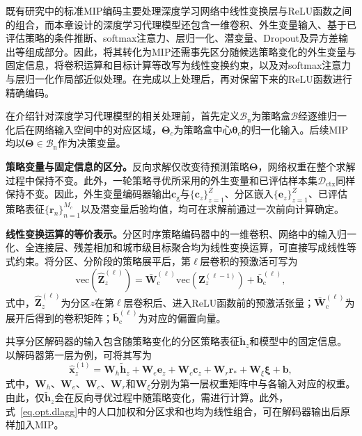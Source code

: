 既有研究中的标准MIP编码主要处理深度学习网络中线性变换层与ReLU函数之间的组合，而本章设计的深度学习代理模型还包含一维卷积、外生变量输入、基于已评估策略的条件推断、softmax注意力、层归一化、潜变量、Dropout及异方差输出等组成部分。因此，将其转化为MIP还需事先区分随候选策略变化的外生变量与固定信息，将卷积运算和目标计算等改写为线性变换约束，以及对softmax注意力与层归一化作局部近似处理。在完成以上处理后，再对保留下来的ReLU函数进行精确编码。

在介绍针对深度学习代理模型的相关处理前，首先定义$\mathcal{B}_{\mathrm{n}}$为策略盒$\mathcal{B}$经逐维归一化后在网络输入空间中的对应区域，$\bm{\Theta}_{c}$为策略盒中心$\bm{\theta}_{c}$的归一化输入。后续MIP均以$\bm{\Theta}\in\mathcal{B}_{\mathrm{n}}$作为决策变量。

\textbf{策略变量与固定信息的区分。}反向求解仅改变待预测策略$\bm{\Theta}$，网络权重在整个求解过程中保持不变。此外，一轮策略寻优所采用的外生变量和已评估样本集$\mathcal{D}_{\mathrm{ctx}}$同样保持不变。因此，外生变量编码器输出$\bm c_{\mathrm g}$与$\{\bm c_z\}_{z=1}^{Z}$、分区嵌入$\{\bm e_z\}_{z=1}^{Z}$、已评估策略表征$\{\bm r_n\}_{n=1}^{M_c}$以及潜变量后验均值，均可在求解前通过一次前向计算确定。

\textbf{线性变换运算的等价表示。}分区时序策略编码器中的一维卷积、网络中的输入归一化、全连接层、残差相加和城市级目标聚合均为线性变换运算，可直接写成线性等式约束。将分区、分阶段的策略展平后，第$\ell$层卷积的预激活可写为
\begin{equation}
\mathrm{vec}\left(\hat{\bm{Z}}_{z}^{(\ell)}\right)
=\bar{\bm{W}}_{\mathrm{c}}^{(\ell)}
\mathrm{vec}\left(\bm{Z}_{z}^{(\ell-1)}\right)
+\bar{\bm{b}}_{\mathrm{c}}^{(\ell)},
\label{eq.opt.convlinear}
\end{equation}
式中，$\hat{\bm Z}_{z}^{(\ell)}$为分区$z$在第$\ell$层卷积后、进入ReLU函数前的预激活张量；$\bar{\bm W}_{\mathrm c}^{(\ell)}$为展开后得到的卷积矩阵；$\bar{\bm b}_{\mathrm c}^{(\ell)}$为对应的偏置向量。

共享分区解码器的输入包含随策略变化的分区策略表征$\tilde{\bm h}_z$和模型中的固定信息。以解码器第一层为例，可将其写为
\begin{equation}
\hat{\bm x}_{z}^{(1)}
=\bm W_{h}\tilde{\bm h}_{z}
+
\bm W_{e}\bm e_z
+\bm W_{c}\bm c_z
+\bm W_{r}\bm r_*
+\bm W_{\xi}\bm\xi
+\bm b
,
\label{eq.opt.decbias}
\end{equation}
式中，$\bm W_h$、$\bm W_e$、$\bm W_c$、$\bm W_r$和$\bm W_\xi$分别为第一层权重矩阵中与各输入对应的权重。由此，仅$\tilde{\bm h}_{z}$会在反向寻优过程中随策略变化，需进行计算。此外，式~\eqref{eq.opt.dlagg}中的人口加权和分区求和也均为线性组合，可在解码器输出后原样加入MIP。

